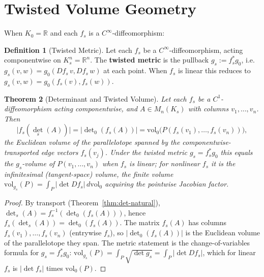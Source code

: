 \documentclass[11pt,twocolumn]{article}
\theoremstyle{plain}
\newtheorem{theorem}{Theorem}
\theoremstyle{definition}
\newtheorem{definition}[theorem]{Definition}
\theoremstyle{remark}
\begin{document}
\section{Twisted Volume Geometry}
\label{sec:geometry}

When $K_0 = \mathbb{R}$ and each $f_s$ is a $C^\infty$-diffeomorphism:

\begin{definition}[Twisted Metric]\label{def:twisted-metric}
Let each $f_s$ be a $C^\infty$-diffeomorphism, acting componentwise on $K_s^n = \mathbb{R}^n$. The \textbf{twisted metric} is the pullback $g_s := f_s^* g_0$, i.e.\ $g_s(v, w) = g_0(Df_s\, v, Df_s\, w)$ at each point. When $f_s$ is linear this reduces to $g_s(v, w) = g_0(f_s(v), f_s(w))$.
\end{definition}

\begin{theorem}[Determinant and Twisted Volume]\label{thm:volume}
Let each $f_s$ be a $C^1$-diffeomorphism acting componentwise, and $A \in M_n(K_s)$ with columns $v_1, \ldots, v_n$. Then
\begin{equation}
\bigl|f_s(\det_s(A))\bigr| = \bigl|\det\nolimits_0(f_s(A))\bigr| = \mathrm{vol}_0\bigl(P(f_s(v_1), \ldots, f_s(v_n))\bigr),
\end{equation}
the Euclidean volume of the parallelotope spanned by the componentwise-transported edge vectors $f_s(v_j)$. Under the twisted metric $g_s = f_s^* g_0$ this equals the $g_s$-volume of $P(v_1, \ldots, v_n)$ when $f_s$ is linear; for nonlinear $f_s$ it is the infinitesimal (tangent-space) volume, the finite volume $\mathrm{vol}_{g_s}(P) = \int_P |\det Df_s|\, d\mathrm{vol}_0$ acquiring the pointwise Jacobian factor.
\end{theorem}

\begin{proof}
By transport (Theorem~\ref{thm:det-natural}), $\det_s(A) = f_s^{-1}(\det_0(f_s(A)))$, hence $f_s(\det_s(A)) = \det_0(f_s(A))$. The matrix $f_s(A)$ has columns $f_s(v_1), \ldots, f_s(v_n)$ (entrywise $f_s$), so $|\det_0(f_s(A))|$ is the Euclidean volume of the parallelotope they span. The metric statement is the change-of-variables formula for $g_s = f_s^* g_0$: $\mathrm{vol}_{g_s}(P) = \int_P \sqrt{\det g_s} = \int_P |\det Df_s|$, which for linear $f_s$ is $|\det f_s|$ times $\mathrm{vol}_0(P)$.
\end{proof}
\end{document}
